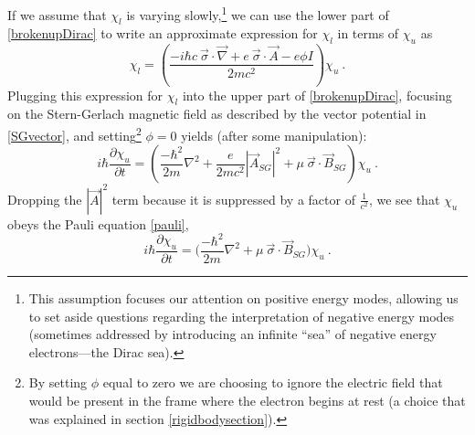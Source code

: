 \documentclass[onecolumn,secnumarabic,amsmath,amssymb,balancelastpage,nofootinbib]{article}
\begin{document}
If we assume that $\chi_l$ is varying slowly,\footnote{This assumption focuses our attention on positive energy modes, allowing us to set aside questions regarding the interpretation of negative energy modes (sometimes addressed by introducing an infinite ``sea'' of negative energy electrons---the Dirac sea).} we can use the lower part of \eqref{brokenupDirac} to write an approximate expression for $\chi_l$ in terms of $\chi_u$ as
\begin{equation}
\chi_l = \left( \frac{- i \hbar c \: \vec{\sigma}\cdot\vec{\nabla} + e \: \vec{\sigma}\cdot\vec{A}-e\phi I}{2 m c^2}\right)\chi_u
\ .
\label{upperlower}
\end{equation}
Plugging this expression for $\chi_l$ into the upper part of \eqref{brokenupDirac}, focusing on the Stern-Gerlach magnetic field as described by the vector potential in \eqref{SGvector}, and setting\footnote{By setting $\phi$ equal to zero we are choosing to ignore the electric field that would be present in the frame where the electron begins at rest (a choice that was explained in section \ref{rigidbodysection}).} $\phi=0$ yields (after some manipulation):
\begin{equation}
i \hbar \frac{\partial \chi_u}{\partial t} =\left( \frac{-\hbar^2}{2 m} \nabla^2 + \frac{e}{2 m c^2} |\vec{A}_{SG}|^2 + \mu\: \vec{\sigma} \cdot \vec{B}_{SG} \right) \chi_u
\ .
\label{almostpauli}
\end{equation}
Dropping the $|\vec{A}|^2$ term because it is suppressed by a factor of $\frac{1}{c^2}$, we see that $\chi_u$ obeys the Pauli equation \eqref{pauli},
\begin{equation}
i \hbar \frac{\partial \chi_u}{\partial t} = \Big(\frac{- \hbar^2}{2 m}\nabla^2+\mu\: \vec{\sigma} \cdot \vec{B}_{SG} \Big)\chi_u
\ .
\label{pauli2}
\end{equation}
\end{document}
